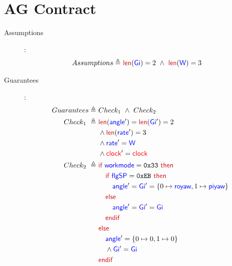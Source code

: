 \documentclass[fleqn,a4paper]{article}
\newcommand\Var[1]{\textcolor{blue}{\textsf{#1}}}
\newcommand\syntax[1]{\textcolor[RGB]{202,12,22}{\textsf{#1}}}
\newcommand\clock{\textcolor{red}{\textsf{clock}}}
\newcommand\definedby{\triangleq}
\begin{document}
\newpage

\section{AG Contract}

\begin{description}

\item[Assumptions]:
\begin{align*}
Assumptions \definedby \
& \syntax{len}(\Var{Gi}) = 2 \ \wedge \ \syntax{len}(\Var{W}) = 3
\end{align*}

\item[Guarantees]:
\begin{align*}
Guarantees \definedby \
& Check_1 \ \wedge \ Check_2 \\
Check_1 \ \definedby \
& \syntax{len}(\Var{angle}') = \syntax{len}(\Var{Gi}') = 2 \\
& \wedge \syntax{len}(\Var{rate}') = 3 \\
& \wedge \Var{rate}' = \Var{W} \\
& \wedge \clock' = \clock \\
Check_2 \ \definedby \
& \syntax{if } \Var{workmode} = \texttt{0x33} \syntax{ then} \\
& \quad \syntax{if } \Var{flgSP} = \texttt{0xEB} \syntax{ then} \\
& \quad \quad \Var{angle}' = \Var{Gi}' = \{0 \mapsto \Var{royaw}, 1 \mapsto \Var{piyaw}\} \\
& \quad \syntax{else} \\
& \quad \quad \Var{angle}' = \Var{Gi}' = \Var{Gi} \\
& \quad \syntax{endif} \\
& \syntax{else} \\
& \quad \Var{angle}' = \{0 \mapsto 0, 1 \mapsto 0\} \\
& \quad \wedge \Var{Gi}' = \Var{Gi} \\
& \syntax{endif} \\
\end{align*}

\end{description}
\end{document}
